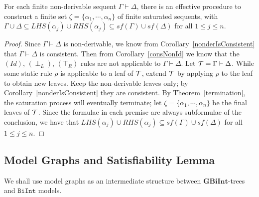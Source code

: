 \documentclass{llncs}
\numberwithin{equation}{section}
\newcommand{\Lg}[1]{\mathtt{#1}}
\newcommand{\sequent}{\vdash}
\newcommand{\Bottom}{\perp}
\newcommand{\Top}{\top}
\newcommand{\mycal}[1]{
        {\cal{#1}}
}
\newcommand {\BiInt}{
        \Lg{BiInt}
}
\newcommand{\GBiInt}{\mathbf{GBiInt}}
\newcommand{\tree}[1]{
        {\mycal{#1}}
}
\newcommand{\IdRule}{(Id)}
\newcommand{\FalseLeftRule}{(\Bottom_L)}
\newcommand{\TrueRightRule}{(\Top_R)}
\begin{document}
\begin{lemma}\label{saturationProcedure}
For each finite non-derivable sequent $\Gamma \sequent \Delta$, there is an effective procedure to construct a finite set $\zeta = \{ \alpha_1, \cdots, \alpha_n \}$ of finite saturated sequents, with $\Gamma \cup \Delta \subseteq LHS(\alpha_j) \cup RHS(\alpha_j) \subseteq sf(\Gamma) \cup sf(\Delta)$ for all $1 \leq j \leq n$.
\end{lemma}
\begin{proof}
Since $\Gamma \sequent \Delta$ is non-derivable, we know from Corollary~\ref{nonderIsConsistent} that $\Gamma \sequent \Delta$ is consistent. Then from Corollary~\ref{consNonId} we know that the $\IdRule$, $\FalseLeftRule$, $\TrueRightRule$ rules are not applicable to $\Gamma \sequent \Delta$. Let $\tree{T} = \Gamma \sequent \Delta$. While some static rule $\rho$ is applicable to a leaf of $\tree{T}$, extend $\tree{T}$ by applying $\rho$ to the leaf to obtain new leaves. Keep the non-derivable leaves only; by Corollary~\ref{nonderIsConsistent} they are consistent. By Theorem~\ref{termination}, the saturation process will eventually terminate; let $\zeta = \{ \alpha_1, \cdots, \alpha_n \}$ be the final leaves of $\tree{T}$. Since the formulae in each premise are always subformulae of the conclusion, we have that $LHS(\alpha_j) \cup RHS(\alpha_j) \subseteq sf(\Gamma) \cup sf(\Delta)$ for all $1 \leq j \leq n$.
\end{proof}

\subsection{Model Graphs and Satisfiability Lemma}

We shall use model graphs as an intermediate structure between $\GBiInt$-trees and $\BiInt$ models.
\end{document}
